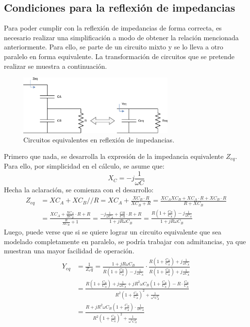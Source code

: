 \documentclass{article}
\begin{document}
\subsection{Condiciones para la reflexión de impedancias}
Para poder cumplir con la reflexión de impedancias de forma correcta, es necesario realizar una simplificación a modo de obtener la relación mencionada anteriormente. Para ello, se parte de un circuito mixto y se lo lleva a otro paralelo en forma equivalente. La transformación de circuitos que se pretende realizar se muestra a continuación.
\begin{figure}[H]
\centering
\includegraphics[width=0.7\textwidth]{./img/figura5.eps}
\caption{Circuitos equivalentes en reflexión de impedancias.}
\label{fig:circuito5}
\end{figure}
Primero que nada, se desarrolla la expresión de la impedancia equivalente $Z_{eq}$. Para ello, por simplicidad en el cálculo, se asume que:
\begin{equation*}
    X_C = -j \frac{1}{\omega C}
\end{equation*}
\noindent Hecha la aclaración, se comienza con el desarrollo:
\begin{align*}
    Z_{eq} &= XC_A + XC_B // R = XC_A + \frac{XC_B \cdot R}{XC_B + R} = \frac{XC_A XC_B + XC_A \cdot R + XC_B \cdot R}{R + XC_B} \\
    &= \frac{XC_A + \frac{XC_A}{XC_B}\cdot R + R}{\frac{R}{XC_B} + 1} = \frac{-j \frac{1}{\omega C_A} + \frac{CB}{CA}\cdot R + R}{1 + j R\omega C_B} = \frac{R \left( 1 + \frac{C_B}{C_A} \right) - j \frac{1}{\omega C_A}}{1 + jR\omega C_B}
\end{align*}
\noindent Luego, puede verse que si se quiere lograr un circuito equivalente que sea modelado completamente en paralelo, se podría trabajar con admitancias, ya que muestran una mayor facilidad de operación.
\begin{align*}
    Y_{eq} &= \frac{1}{Z_eq} = \frac{1 + jR\omega C_B}{R \left( 1 + \frac{C_B}{C_A} \right) - j \frac{1}{\omega C_A}} \cdot \frac{R \left( 1 + \frac{C_B}{C_A} \right) + j \frac{1}{\omega C_A}}{R \left( 1 + \frac{C_B}{C_A} \right) + j \frac{1}{\omega C_A}} \\
    &= \frac{R \left( 1 + \frac{C_B}{C_A} \right) + j \frac{1}{\omega C_A} + j R^2\omega C_B \left( 1 + \frac{C_B}{C_A}\right) - R \cdot \frac{C_B}{C_A}}{R^2 \left( 1 + \frac{C_B}{C_A} \right)^2 + \frac{1}{\omega^2 C_A^2}} \\
    &= \frac{R + j R^2\omega C_B \left( 1 + \frac{C_B}{C_A} \right) \cdot \frac{1}{\omega C_A}}{R^2 \left( 1 + \frac{C_B}{C_A} \right)^2 + \frac{1}{\omega^2 C_A^2}}
\end{align*}
\end{document}
